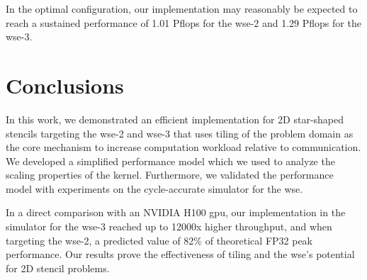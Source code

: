 In the optimal configuration, our implementation may reasonably be expected to reach a sustained performance of 1.01 P\ac{flops} for the \ac{wse}-2 and 1.29 P\ac{flops} for the \ac{wse}-3.

\section{Conclusions}
In this work, we demonstrated an efficient implementation for 2D star-shaped stencils targeting the \ac{wse}-2 and \ac{wse}-3 that uses tiling of the problem domain as the core mechanism to increase computation workload relative to communication. We developed a simplified performance model which we used to analyze the scaling properties of the kernel. Furthermore, we validated the performance model with experiments on the cycle-accurate simulator for the \ac{wse}.

In a direct comparison with an NVIDIA H100 \ac{gpu}, our implementation in the simulator for the \ac{wse}-3 reached up to 12000x higher throughput, and when targeting the \ac{wse}-2, a predicted value of 82\% of theoretical FP32 peak performance. Our results prove the effectiveness of tiling and the \ac{wse}'s potential for 2D stencil problems.